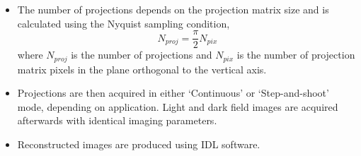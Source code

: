 \begin{itemize}
	\item The number of projections depends on the projection matrix size and is calculated using the Nyquist sampling condition,
	\begin{equation}
	N_{proj} = \frac{\pi}{2} N_{pix}
	\end{equation} 
	where $N_{proj}$ is the number of projections and $N_{pix}$ is the number of projection matrix pixels in the plane orthogonal to the vertical axis.
	
	
	\item Projections are then acquired in either `Continuous' or `Step-and-shoot' mode, depending on application. Light and dark field images are acquired afterwards with identical imaging parameters. 

	
	\item Reconstructed images are produced using IDL software. 
	
	
\end{itemize}






